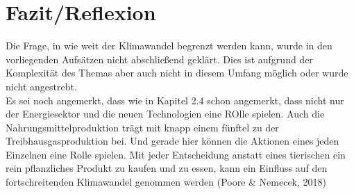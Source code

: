 \chapter{Fazit/Reflexion}
Die Frage, in wie weit der Klimawandel begrenzt werden kann, wurde in den vorliegenden Aufsätzen nicht abschließend geklärt. Dies ist aufgrund der Komplexität des Themas aber auch nicht in diesem Umfang möglich oder wurde nicht angestrebt.\\
Es sei noch angemerkt, dass wie in Kapitel 2.4 schon angemerkt, dass nicht nur der Energiesektor und die neuen Technologien eine ROlle spielen. Auch die Nahrungsmittelproduktion trägt mit knapp einem fünftel zu der Treibhausgasproduktion bei. Und gerade hier können die Aktionen eines jeden Einzelnen eine Rolle spielen. Mit jeder Entscheidung anstatt eines tierischen ein rein pflanzliches Produkt zu kaufen und zu essen, kann ein Einfluss auf den fortschreitenden Klimawandel genommen werden (Poore \& Nemecek, 2018)\\
